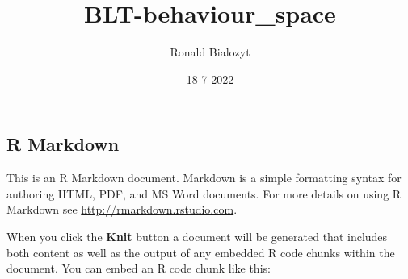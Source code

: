 \documentclass[
]{article}
\title{BLT-behaviour\_space}
\author{Ronald Bialozyt}
\date{18 7 2022}
\begin{document}
\maketitle

\hypertarget{r-markdown}{%
\subsection{R Markdown}\label{r-markdown}}

This is an R Markdown document. Markdown is a simple formatting syntax
for authoring HTML, PDF, and MS Word documents. For more details on
using R Markdown see \url{http://rmarkdown.rstudio.com}.

When you click the \textbf{Knit} button a document will be generated
that includes both content as well as the output of any embedded R code
chunks within the document. You can embed an R code chunk like this:
\end{document}
